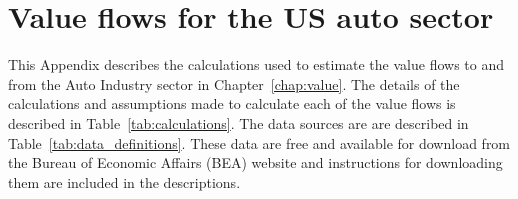 %
%
%
\chapter{Value flows for the US auto sector}
\label{chap:auto_value_flows} 


This Appendix describes the calculations used 
to estimate the value flows to and from the Auto Industry sector 
in Chapter~\ref{chap:value}.  
The details of the calculations and assumptions made to calculate 
each of the value flows is described in Table~\ref{tab:calculations}. 
The data sources are are described in Table~\ref{tab:data_definitions}. 
These data are free and available for download from the Bureau of Economic Affairs (BEA) website
and instructions for downloading them are included in the descriptions.

